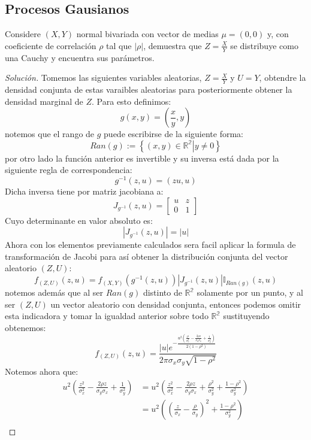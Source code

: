 \documentclass[11pt,notitlepage]{article}
\newenvironment{solucion}
  {\begin{proof}[Solución]}
  {\end{proof}}
\begin{document}
\subsection{Procesos Gausianos} Considere \((X,Y)\) normal bivariada con vector de medias \(\mu = (0,0)\) y, con coeficiente de correlación \(\rho\) tal que \(\left | \rho \right |\), demuestra que \(Z = \frac{X}{Y}\) se distribuye como una Cauchy y encuentra sus parámetros. 
\begin{solucion}
Tomemos las siguientes variables aleatorias, \(Z = \frac{X}{Y}\) y \(U = Y\), obtendre la densidad conjunta de estas varaibles aleatorias para posteriormente obtener la densidad marginal de \(Z\). Para esto definimos: 
\[g(x,y) =  \left ( \frac{x}{y},y  \right )\]
notemos que el rango de \(g\) puede escribirse de la siguiente forma: 
\[Ran(g):=\left \{ (x,y) \in \mathbb{R^2} \left |  \right. y \neq 0 \right \}\]
por otro lado la función anterior es invertible y su inversa está dada por la siguiente regla de correspondencia:
\[g^{-1}(z,u) =  \left ( zu,u  \right )\]
Dicha inversa tiene por matriz jacobiana a: 
\[J_{g^{-1}}(z,u) = \begin{bmatrix}
u & z\\ 
0 & 1
\end{bmatrix}\]
Cuyo determinante en valor absoluto es: 
\[\left | J_{g^{-1}}(z,u) \right |  = \left | u \right |\]
Ahora con los elementos previamente calculados sera facil aplicar la formula de transformación de Jacobi para así obtener la distribución conjunta del vector aleatorio \((Z,U)\): 
\[f_{(Z,U)}(z,u)= f_{(X,Y)}(g^{-1}(z,u))\left | J_{g^{-1}}(z,u) \right |\mathbb{I}_{Ran(g)}(z,u)\]
notemos además que al ser \(Ran(g)\) distinto de \(\mathbb{R^2}\) solamente por un punto, y al ser \((Z,U)\) un vector aleatorio con densidad conjunta, entonces podemos omitir esta indicadora y tomar la igualdad anterior sobre todo \(\mathbb{R^{2}}\) 
sustituyendo obtenemos: 
\[f_{(Z,U)}(z,u) = \frac{\left | u \right |e^{-\frac{u^{2}\left ( \frac{z^2}{\sigma_{x}^2} - \frac{2\rho z}{\sigma_{y}\sigma_{x}} + \frac{1}{\sigma_{y}^2} \right ) }{2(1-\rho^2)}}}{2\pi\sigma_{x}\sigma_{y}\sqrt{1-\rho^2}} \]
Notemos ahora que: 
\begin{align*}
     u^{2}\left ( \frac{z^2}{\sigma_{x}^2} - \frac{2\rho z}{\sigma_{y}\sigma_{x}} + \frac{1}{\sigma_{y}^2} \right )  &= u^{2}\left ( \frac{z^2}{\sigma_{x}^2} - \frac{2\rho z}{\sigma_{y}\sigma_{x}} + \frac{\rho^2}{\sigma_{y}^2} + \frac{1 - \rho^2}{\sigma_{y}^2} \right ) \\
       &= u^{2}\left (\left (\frac{z}{\sigma_{x}} - \frac{\rho}{\sigma_{y}} \right )^2 +   \frac{1 - \rho^2}{\sigma_{y}^2}\right )         \\

\end{align*}
\end{solucion}
\end{document}

